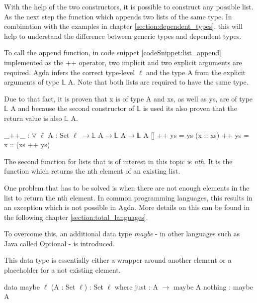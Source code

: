 With the help of the two constructors, it is possible to construct any possible list. As the next step the function which appends two lists of the same type. In combination with the examples in chapter \ref{section:dependent_types}, this will help to understand the difference between generic types and dependent types.

To call the append function, in code snippet \ref{codeSnippet:list_append} implemented as the ++ operator, two implicit and two explicit arguments are required. 
Agda infers the correct type-level $\ell$ and the type A from the explicit arguments of type $\mathbb{L}$ A. 
Note that both lists are required to have the same type.

Due to that fact, it is proven that x is of type A and xs, as well as ys, are of type $\mathbb{L}$ A and 
because the second constructor of $\mathbb{L}$ is used its also proven that the return value is also $\mathbb{L}$ A.

\begin{codesnippet}[mathescape=true, caption={Definition of the list append function in Agda}, label={codeSnippet:list_append}]
_++_ : $\forall$ {$\ell$} {A : Set $\ell$} $\rightarrow \mathbb{L}$ A$\rightarrow \mathbb{L}$ A$\rightarrow \mathbb{L}$ A
  []        ++ ys = ys
  (x :: xs) ++ ys = x :: (xs ++ ys)
\end{codesnippet}

The second function for lists that is of interest in this topic is \emph{nth}.
It is the function which returns the nth element of an existing list.

One problem that has to be solved is when there are not enough elements in the list to return the nth element. 
In common programming languages, this results in an exception which is not possible in Agda.
More details on this can be found in the following chapter \ref{section:total_languages}.

To overcome this, an additional data type \emph{maybe} - in other languages such as Java called Optional - is introduced.

This data type is essentially either a wrapper around another element or a placeholder for a not existing element.

\begin{codesnippet}[mathescape=true, caption={Definition of the maybe datatype in Agda}, label={codeSnippet:maybe_datatype}]
data maybe {$\ell$} (A : Set $\ell$) : Set $\ell$ where
  just : A $\rightarrow$ maybe A
  nothing : maybe A
\end{codesnippet}

